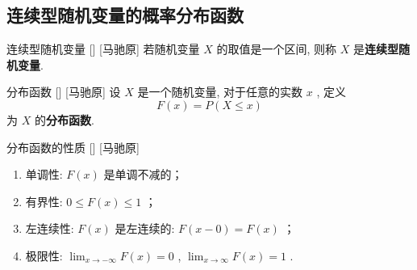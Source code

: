 \documentclass[UTF8]{ctexart}
\begin{document}
    \subsection{连续型随机变量的概率分布函数}

        \begin{dfn}
            []
            {连续型随机变量}
            []
            [马驰原]
            若随机变量 \(X\) 的取值是一个区间, 则称 \(X\) 是\textbf{连续型随机变量}. 
        \end{dfn}

        \begin{dfn}
            []
            {分布函数}
            []
            [马驰原]
            设 \(X\) 是一个随机变量, 对于任意的实数 \(x\) , 定义\[F(x)=P(X\leq x)\]为 \(X\) 的\textbf{分布函数}. 
        \end{dfn}

        \begin{ppt}
            []
            {分布函数的性质}
            []
            [马驰原]
            \begin{enumerate}
                \item 单调性:  \(F(x)\) 是单调不减的；
                \item 有界性:  \(0\leq F(x)\leq 1\) ；
                \item 左连续性:  \(F(x)\) 是左连续的:  \(F(x-0)=F(x)\) ；
                \item 极限性:  \(\lim_{x\to-\infty}F(x)=0\) ,  \(\lim_{x\to\infty}F(x)=1\) . 
            \end{enumerate}
        \end{ppt}
\end{document}
